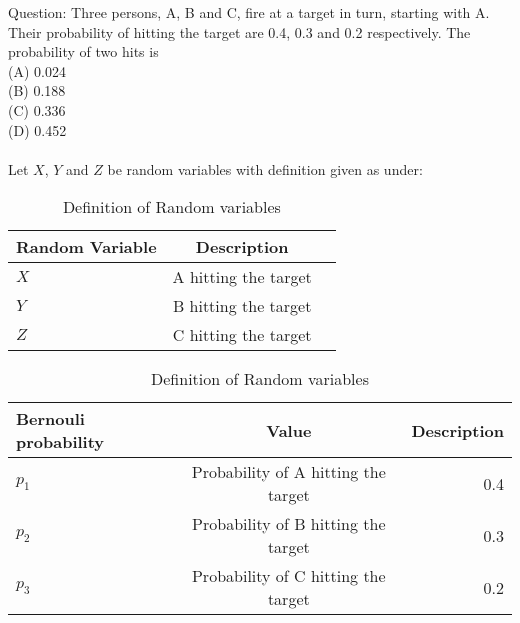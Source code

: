 \documentclass[journal,12pt,onecolumn]{IEEEtran}
\theoremstyle{remark}
\begin{document}
\let\vec\mathbf




\vspace{3cm}



\bigskip

\renewcommand{\thefigure}{\theenumi}
\renewcommand{\thetable}{\theenumi}
Question: Three persons, A, B and C, fire at a target in turn, starting with A. Their probability of hitting the target are 0.4, 0.3 and 0.2 respectively. The probability of two hits is\\
(A) 0.024\\
(B) 0.188\\
(C) 0.336\\
(D) 0.452\\
\solution \\
Let $X$, $Y$ and $Z$ be random variables with definition given as under:
\begin{table}[h]
\centering
\begin{tabular}{|l|c|r|}
\hline
    Random Variable &  Description\\
    \hline
    $X$ & A hitting the target \\
    \hline
    $Y$ &  B hitting the target \\
    \hline
    $Z$ &  C hitting the target\\
    \hline
\end{tabular}
\label{tab:ncert/12/13/3/76/}
\caption{Definition of Random variables}
\end{table}
\begin{table}[h]
\centering
\begin{tabular}{|l|c|r|}
\hline
    Bernouli probability & Value & Description\\
    \hline
    $p_1$ & Probability of A hitting the target &0.4\\
    \hline
    $p_2$ &  Probability of B hitting the target&0.3 \\
    \hline
    $p_3$ &  Probability of C hitting the target&0.2\\
    \hline
\end{tabular}
\label{tab:ncert/12/13/3/76/}
\caption{Definition of Random variables}
\end{table}
\end{document}
